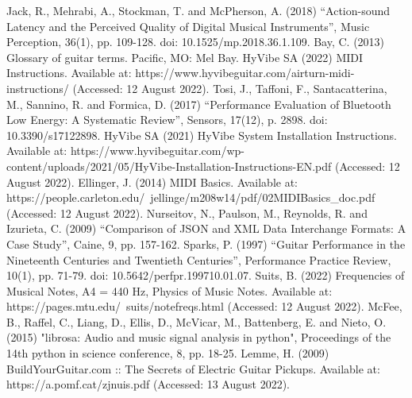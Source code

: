 \documentclass[conference]{IEEEtran}
\begin{document}
\begin{thebibliography}{00}
 Jack, R., Mehrabi, A., Stockman, T. and McPherson, A. (2018) ``Action-sound Latency and the Perceived Quality of Digital Musical Instruments'', Music Perception, 36(1), pp. 109-128. doi: 10.1525/mp.2018.36.1.109.
 Bay, C. (2013) Glossary of guitar terms. Pacific, MO: Mel Bay.
 HyVibe SA (2022) MIDI Instructions. Available at: https://www.hyvibeguitar.com/airturn-midi-instructions/ (Accessed: 12 August 2022).
 Tosi, J., Taffoni, F., Santacatterina, M., Sannino, R. and Formica, D. (2017) ``Performance Evaluation of Bluetooth Low Energy: A Systematic Review'', Sensors, 17(12), p. 2898. doi: 10.3390/s17122898.
 HyVibe SA (2021) HyVibe System Installation Instructions. Available at: https://www.hyvibeguitar.com/wp-content/uploads/2021/05/HyVibe-Installation-Instructions-EN.pdf (Accessed: 12 August 2022).
 Ellinger, J. (2014) MIDI Basics. Available at: https://people.carleton.edu/~jellinge/m208w14/pdf/02MIDIBasics\_doc.pdf (Accessed: 12 August 2022).
 Nurseitov, N., Paulson, M., Reynolds, R. and Izurieta, C. (2009) ``Comparison of JSON and XML Data Interchange Formats: A Case Study'', Caine, 9, pp. 157-162.
 Sparks, P. (1997) ``Guitar Performance in the Nineteenth Centuries and Twentieth Centuries'', Performance Practice Review, 10(1), pp. 71-79. doi: 10.5642/perfpr.199710.01.07.
 Suits, B. (2022) Frequencies of Musical Notes, A4 = 440 Hz, Physics of Music Notes. Available at: https://pages.mtu.edu/~suits/notefreqs.html (Accessed: 12 August 2022).
 McFee, B., Raffel, C., Liang, D., Ellis, D., McVicar, M., Battenberg, E. and Nieto, O. (2015) "librosa: Audio and music signal analysis in python", Proceedings of the 14th python in science conference, 8, pp. 18-25. 
 Lemme, H. (2009) BuildYourGuitar.com :: The Secrets of Electric Guitar Pickups. Available at: https://a.pomf.cat/zjnuis.pdf (Accessed: 13 August 2022).

\end{thebibliography}
\vspace{12pt}
\end{document}
